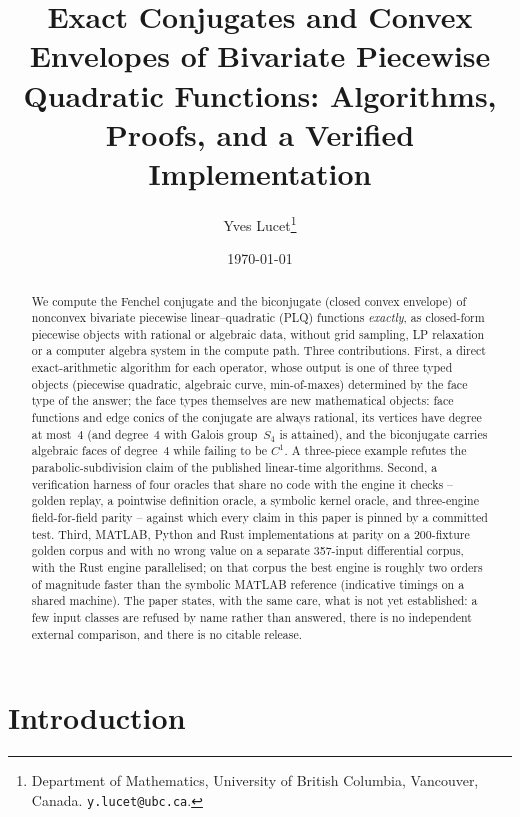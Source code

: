 \documentclass[11pt]{article}
\title{Exact Conjugates and Convex Envelopes of Bivariate Piecewise Quadratic
       Functions: Algorithms, Proofs, and a Verified Implementation}
\author{Yves Lucet\thanks{Department of Mathematics, University of British
        Columbia, Vancouver, Canada. \texttt{y.lucet@ubc.ca}.}}
\date{\today}
\theoremstyle{definition}
\begin{document}
\maketitle

\begin{abstract}
We compute the Fenchel conjugate and the biconjugate (closed convex envelope) of
nonconvex bivariate piecewise linear--quadratic (PLQ) functions \emph{exactly},
as closed-form piecewise objects with rational or algebraic data, without grid
sampling, LP relaxation or a computer algebra system in the compute path. Three
contributions. First, a direct exact-arithmetic algorithm for each operator,
whose output is one of three typed objects (piecewise quadratic, algebraic
curve, min-of-maxes) determined by the face type of the answer; the face types
themselves are new mathematical objects: face functions and edge conics of the
conjugate are always rational, its vertices have degree at most~$4$ (and degree~$4$
with Galois group~$S_4$ is attained), and the biconjugate carries algebraic
faces of degree~$4$ while failing to be $C^1$. A three-piece example refutes the
parabolic-subdivision claim of the published linear-time algorithms. Second, a
verification harness of four oracles that share no code with the engine it
checks -- golden replay, a pointwise definition oracle, a symbolic kernel oracle,
and three-engine field-for-field parity -- against which every claim in this
paper is pinned by a committed test. Third, MATLAB, Python and Rust
implementations at parity on a 200-fixture golden corpus and with no wrong
value on a separate 357-input differential corpus, with the Rust engine
parallelised; on that corpus the best engine is roughly two orders of magnitude
faster than the symbolic MATLAB reference (indicative timings on a shared
machine). The paper states, with the same care, what is not yet established:
a few input classes are refused by
name rather than answered, there is no independent external comparison, and
there is no citable release.
\end{abstract}

\section{Introduction}
\end{document}
